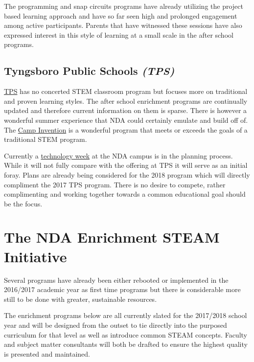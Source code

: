 \documentclass{article}
\begin{document}
The programming and snap circuits programs have already utilizing the project based learning approach and have so far seen high and prolonged engagement among active participants. Parents that have witnessed these sessions have also expressed interest in this style of learning at a small scale in the after school programs.

\subsection*{Tyngsboro Public Schools \textit{(TPS)}}

\href{http://www.tyngsboroughps.org/pages/Tyngsborough}{TPS} has no concerted STEM classroom program but focuses more on traditional and proven learning styles. The after school enrichment programs are continually updated and therefore current information on them is sparse. There is however a wonderful summer experience that NDA could certainly emulate and build off of. The \href{http://tes.tyngsboroughps.org/files/_ZGCSx_/3c999668dcbe59b83745a49013852ec4/2017SummerAdventure.pdf}{Camp Invention} is a wonderful program that meets or exceeds the goals of a traditional STEM program.

Currently a \href{http://www.ndatyngsboro.org/activities-camp/tech-camp}{technology week} at the NDA campus is in the planning process. While it will not fully compare with the offering at TPS it will serve as an initial foray. Plans are already being considered for the 2018 program which will directly compliment the 2017 TPS program. There is no desire to compete, rather complimenting and working together towards a common educational goal should be the focus.


\section*{The NDA Enrichment STEAM Initiative}
Several programs have already been either rebooted or implemented in the 2016/2017 academic year as first time programs but there is considerable more still to be done with greater, sustainable resources. 

The enrichment programs below are all currently slated for the 2017/2018 school year and will be designed from the outset to tie directly into the purposed curriculum for that level as well as introduce common STEAM concepts. Faculty and subject matter consultants will both be drafted to ensure the highest quality is presented and maintained.
\end{document}
